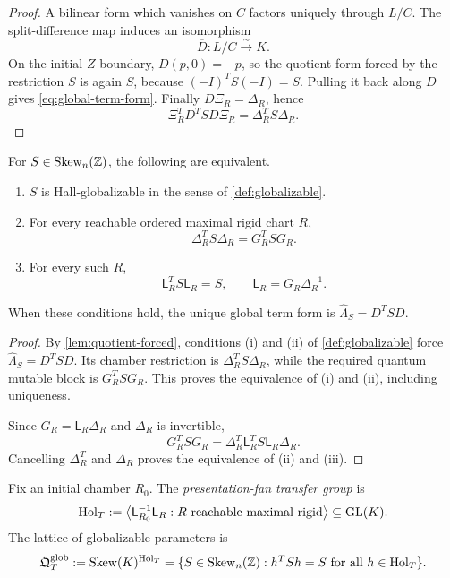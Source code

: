 \begin{proof}
A bilinear form which vanishes on $C$ factors uniquely through
$L/C$.  The split-difference map induces an isomorphism
\[
 \overline D:L/C\xrightarrow{\sim}K.
\]
On the initial $Z$-boundary, $D(p,0)=-p$, so the quotient form forced by the
restriction $S$ is again $S$, because $(-I)^TS(-I)=S$.  Pulling it back along
$D$ gives \cref{eq:global-term-form}.  Finally
$D\Xi_R=\Delta_R$, hence
\[
 \Xi_R^TD^TSD\Xi_R=\Delta_R^TS\Delta_R.
\]
\end{proof}

\begin{theorem}
\label{thm:globalization-criterion}
For $S\in\operatorname{Skew}_n(\mathbb Z)$, the following are equivalent.
\begin{enumerate}[label=(\roman*),leftmargin=2.4em]
\item $S$ is Hall-globalizable in the sense of
      \cref{def:globalizable}.
\item For every reachable ordered maximal rigid chart $R$,
      \begin{equation}
       \Delta_R^TS\Delta_R=G_R^TSG_R.
       \label{eq:Delta-G-S}
      \end{equation}
\item For every such $R$,
      \begin{equation}
       \mathsf L_R^TS\mathsf L_R=S,
       \qquad \mathsf L_R=G_R\Delta_R^{-1}.
       \label{eq:transfer-invariance}
      \end{equation}
\end{enumerate}
When these conditions hold, the unique global term form is
$\widehat\Lambda_S=D^TSD$.
\end{theorem}

\begin{proof}
By \cref{lem:quotient-forced}, conditions (i) and (ii) of
\cref{def:globalizable} force
$\widehat\Lambda_S=D^TSD$.  Its chamber restriction is
$\Delta_R^TS\Delta_R$, while the required quantum mutable block is
$G_R^TSG_R$.  This proves the equivalence of (i) and (ii), including
uniqueness.

Since $G_R=\mathsf L_R\Delta_R$ and $\Delta_R$ is invertible,
\[
 G_R^TSG_R
 =\Delta_R^T\mathsf L_R^TS\mathsf L_R\Delta_R.
\]
Cancelling $\Delta_R^T$ and $\Delta_R$ proves the equivalence of (ii) and
(iii).
\end{proof}

\begin{definition}
\label{def:holonomy}
Fix an initial chamber $R_0$.  The \emph{presentation-fan transfer group} is
\[
 \operatorname{Hol}_T
 :=\left\langle
    \mathsf L_{R_0}^{-1}\mathsf L_R:
    R\text{ reachable maximal rigid}
   \right\rangle
 \subseteq\mathrm{GL}(K).
\]
The lattice of globalizable parameters is
\begin{equation}
 \mathfrak Q^{\mathrm{glob}}_T
 :=\operatorname{Skew}(K)^{\operatorname{Hol}_T}
 =\{S\in\operatorname{Skew}_n(\mathbb Z):h^TSh=S\text{ for all }h\in\operatorname{Hol}_T\}.
 \label{eq:globalizable-lattice}
\end{equation}
\end{definition}

